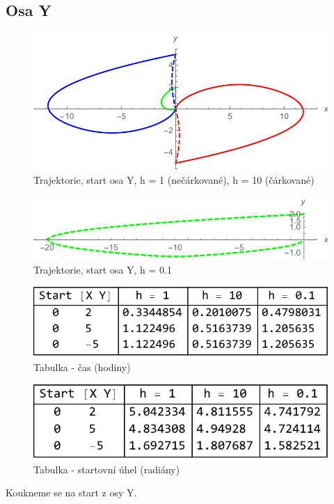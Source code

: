 \documentclass[reqno, a4paper]{amsart}
\numberwithin{equation}{section}
\begin{document}
\subsection{Osa Y}
\label{sec: OsaY}
\begin{figure}
\includegraphics[scale=0.7]{figures/OsaY1.pdf}
\caption{Trajektorie, start osa Y, h = 1 (nečárkované), h = 10 (čárkované)}
\label{Ytraj}
\end{figure}
\begin{figure}
\includegraphics[scale=0.7]{figures/OsaY4.pdf}
\caption{Trajektorie, start osa Y, h = 0.1}
\label{Ytraj0.1}
\end{figure}
\begin{figure}
\includegraphics[scale=0.7]{figures/OsaY - tab. čas.pdf}
\caption{Tabulka - čas (hodiny)}
\label{TabY1}
\end{figure}
\begin{figure}
\includegraphics[scale=0.7]{figures/OsaY - tab. beta.pdf}
\caption{Tabulka - startovní úhel (radiány)}
\label{TabY2}
\end{figure}
Koukneme se na start z osy Y.
\end{document}
